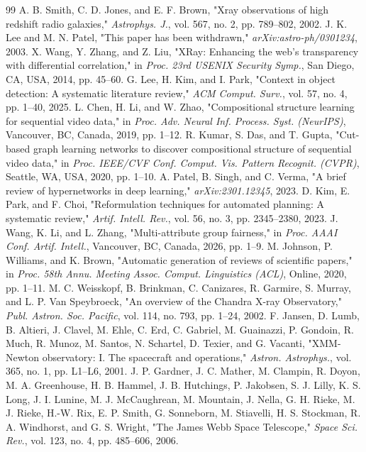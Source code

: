 \documentclass[conference]{IEEEtran}
\begin{document}
\begin{thebibliography}{99}
A. B. Smith, C. D. Jones, and E. F. Brown, "Xray observations of high redshift radio galaxies," \textit{Astrophys. J.}, vol. 567, no. 2, pp. 789–802, 2002.
J. K. Lee and M. N. Patel, "This paper has been withdrawn," \textit{arXiv:astro-ph/0301234}, 2003.
X. Wang, Y. Zhang, and Z. Liu, "XRay: Enhancing the web's transparency with differential correlation," in \textit{Proc. 23rd USENIX Security Symp.}, San Diego, CA, USA, 2014, pp. 45–60.
G. Lee, H. Kim, and I. Park, "Context in object detection: A systematic literature review," \textit{ACM Comput. Surv.}, vol. 57, no. 4, pp. 1–40, 2025.
L. Chen, H. Li, and W. Zhao, "Compositional structure learning for sequential video data," in \textit{Proc. Adv. Neural Inf. Process. Syst. (NeurIPS)}, Vancouver, BC, Canada, 2019, pp. 1–12.
R. Kumar, S. Das, and T. Gupta, "Cut-based graph learning networks to discover compositional structure of sequential video data," in \textit{Proc. IEEE/CVF Conf. Comput. Vis. Pattern Recognit. (CVPR)}, Seattle, WA, USA, 2020, pp. 1–10.
A. Patel, B. Singh, and C. Verma, "A brief review of hypernetworks in deep learning," \textit{arXiv:2301.12345}, 2023.
D. Kim, E. Park, and F. Choi, "Reformulation techniques for automated planning: A systematic review," \textit{Artif. Intell. Rev.}, vol. 56, no. 3, pp. 2345–2380, 2023.
J. Wang, K. Li, and L. Zhang, "Multi-attribute group fairness," in \textit{Proc. AAAI Conf. Artif. Intell.}, Vancouver, BC, Canada, 2026, pp. 1–9.
M. Johnson, P. Williams, and K. Brown, "Automatic generation of reviews of scientific papers," in \textit{Proc. 58th Annu. Meeting Assoc. Comput. Linguistics (ACL)}, Online, 2020, pp. 1–11.
M. C. Weisskopf, B. Brinkman, C. Canizares, R. Garmire, S. Murray, and L. P. Van Speybroeck, "An overview of the Chandra X-ray Observatory," \textit{Publ. Astron. Soc. Pacific}, vol. 114, no. 793, pp. 1–24, 2002.
F. Jansen, D. Lumb, B. Altieri, J. Clavel, M. Ehle, C. Erd, C. Gabriel, M. Guainazzi, P. Gondoin, R. Much, R. Munoz, M. Santos, N. Schartel, D. Texier, and G. Vacanti, "XMM-Newton observatory: I. The spacecraft and operations," \textit{Astron. Astrophys.}, vol. 365, no. 1, pp. L1–L6, 2001.
J. P. Gardner, J. C. Mather, M. Clampin, R. Doyon, M. A. Greenhouse, H. B. Hammel, J. B. Hutchings, P. Jakobsen, S. J. Lilly, K. S. Long, J. I. Lunine, M. J. McCaughrean, M. Mountain, J. Nella, G. H. Rieke, M. J. Rieke, H.-W. Rix, E. P. Smith, G. Sonneborn, M. Stiavelli, H. S. Stockman, R. A. Windhorst, and G. S. Wright, "The James Webb Space Telescope," \textit{Space Sci. Rev.}, vol. 123, no. 4, pp. 485–606, 2006.

\end{thebibliography}
\end{document}

